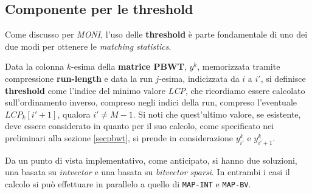 \subsection{Componente per le threshold}
Come discusso per \textit{MONI}, l'uso delle \textbf{threshold} è parte
fondamentale di uno dei due modi per ottenere le \textit{matching
  statistics}. \\
\begin{definizione}
  Data la colonna $k$-esima della \textbf{matrice PBWT}, $y^k$, memorizzata
  tramite compressione \textbf{run-length} e data la run $j$-esima, indicizzata
  da $i$ a $i'$, si definisce \textbf{threshold} come l'indice del minimo valore
  \textit{LCP}, che ricordiamo essere calcolato sull'ordinamento inverso,
  compreso negli indici della run, compreso l'eventuale 
  $LCP_k[i'+1]$, qualora $i'\neq M-1$. Si noti che quest'ultimo valore, se
  esistente, deve essere considerato in quanto per il suo calcolo, come
  specificato nei preliminari alla sezione \ref{secpbwt}, si prende in
  considerazione $y^k_{i'}$ e $y^k_{i'+1}$.
\end{definizione}
Da un punto di vista implementativo, come anticipato, si hanno due soluzioni,
una basata su \textit{intvector} e una basata su \textit{bitvector sparsi}. In
entrambi i casi il calcolo si può effettuare in parallelo a quello di
\texttt{MAP-INT} e \texttt{MAP-BV}.
